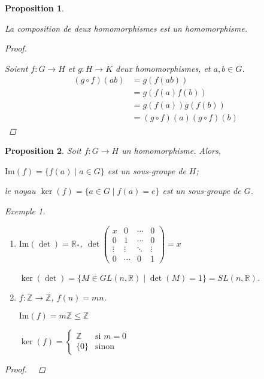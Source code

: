 \documentclass{report}
\newcommand*{\lte}{\leqslant}
\newcommand*{\reels}{\mathbb{R}}
\newcommand*{\entiers}{\mathbb{Z}}
\newtheorem*{prop}{Proposition}
\theoremstyle{definition}
\theoremstyle{remark}
\newtheorem*{exem}{Exemple}
\begin{document}
	\begin{prop}~

		La composition de deux homomorphismes est un homomorphisme.
		\begin{proof}~

			Soient $f:G \to H$ et $g:H \to K$ deux homomorphismes, et $a,b \in G$.
			\begin{align*}
				(g \circ f)(ab)&= g(f(ab))\\
				&= g(f(a)f(b))\\
				&= g(f(a))g(f(b))\\
				&= (g \circ f)(a) (g \circ f)(b)
			\end{align*}
		\end{proof}
	\end{prop}
	\begin{prop}
		Soit $f:G \to H$ un homomorphisme. Alors,
		\begin{nlist}
			\item 	$\mathrm{Im}(f) = \{f(a) \mid a \in G\}$ est un sous-groupe de $H$;
			\item le \emph{noyau} $\ker(f) = \{a \in G \mid f(a) = e\}$ est un sous-groupe de $G$.
		\end{nlist}
		\begin{exem}~

			\begin{enumerate}[label=(\alph*)]
				\item $\mathrm{Im}(\det) = \reels_*$, $\det\begin{pmatrix}
					x&0&\dotsb&0\\
					0&1&\dotsb&0\\
					\vdots&\vdots&\ddots&\vdots\\
					0&\dotsb&0&1
				\end{pmatrix}=x$

				$\ker(\det) = \{M \in GL(n,\reels) \mid \det(M)=1\} = SL(n,\reels)$.
				\item $f:\entiers \to \entiers$, $f(n)=mn$.

				$\mathrm{Im}(f) = m\entiers \lte \entiers$

				$\ker(f) = \left\{ \begin{array}{rl}
					\entiers&\text{si } m=0\\
					\{0\}&\text{sinon}
				\end{array} \right.$
			\end{enumerate}
		\end{exem}
		\begin{proof}~


\end{proof}
\end{prop}
\end{document}
